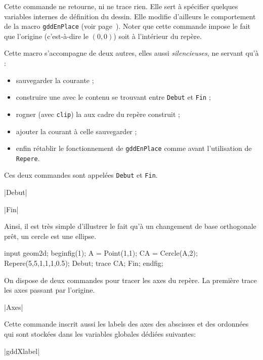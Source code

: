 \documentclass[a4paper,french]{article}
\begin{document}
Cette commande ne retourne, ni ne trace rien. Elle sert à spécifier quelques
variables internes de définition du dessin. Elle modifie d'ailleurs le
comportement de la macro \lstinline+gddEnPlace+ (voir
page~\pageref{gddEnPlace}). Noter que cette commande impose le fait que
l'origine (c'est-à-dire le  $(0,0)$) soit à l'intérieur du
repère.

Cette macro s'accompagne de deux autres, elles aussi \emph{silencieuses}, ne
servant qu'à :
\begin{itemize}
\item sauvegarder la  courante ;
\item construire une  avec le contenu se trouvant entre
\lstinline+Debut+ et \lstinline+Fin+ ;
\item rogner (avec \lstinline+clip+) la  aux cadre du repère
construit ;
\item ajouter la  courant à celle sauvegarder ;
\item enfin rétablir le
fonctionnement de \lstinline+gddEnPlace+ comme avant l'utilisation de
\lstinline+Repere+.
\end{itemize} 

Ces deux commandes sont appelées \lstinline+Debut+ et
\lstinline+Fin+.

\begin{colourband}
\macro|Debut|
\end{colourband}


\begin{colourband}
\macro|Fin|
\end{colourband}

Ainsi, il est très simple d'illustrer le fait qu'à un changement de base
orthogonale prêt, un cercle est une ellipse.

\begin{ExempleMP}
input geom2d;
beginfig(1);
A = Point(1,1);
CA = Cercle(A,2);
Repere(5,5,1,1,1,0.5);
Debut;
trace CA;
Fin;
endfig;
\end{ExempleMP}

On dispose de deux commandes pour tracer les axes du repère. La première trace
les axes passant par l'origine.
\begin{colourband}
\macro|Axes|
\end{colourband}

Cette commande inscrit aussi les labels des axes des abscisses et des ordonnées
qui sont stockées dans les variables globales dédiées suivantes:
\begin{colourband}
\macro|gddXlabel|
\end{colourband}
\end{document}
